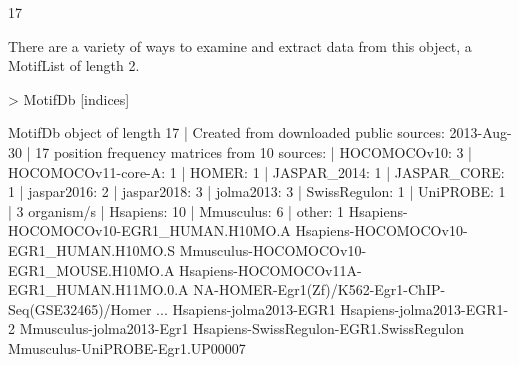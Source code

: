 \documentclass{article}
\renewenvironment{Schunk}{\vspace{\topsep}}{\vspace{\topsep}}
\begin{document}
\begin{Schunk}
\begin{Soutput}
[1] 17
\end{Soutput}
\end{Schunk}
There are a variety of ways to examine and extract data from this object, a MotifList of length 2.
\begin{Schunk}
\begin{Sinput}
> MotifDb [indices]
\end{Sinput}
\begin{Soutput}
MotifDb object of length 17
| Created from downloaded public sources: 2013-Aug-30
| 17 position frequency matrices from 10 sources:
|        HOCOMOCOv10:    3
| HOCOMOCOv11-core-A:    1
|              HOMER:    1
|        JASPAR_2014:    1
|        JASPAR_CORE:    1
|         jaspar2016:    2
|         jaspar2018:    3
|          jolma2013:    3
|       SwissRegulon:    1
|           UniPROBE:    1
| 3 organism/s
|           Hsapiens:   10
|          Mmusculus:    6
|              other:    1
Hsapiens-HOCOMOCOv10-EGR1_HUMAN.H10MO.A 
Hsapiens-HOCOMOCOv10-EGR1_HUMAN.H10MO.S 
Mmusculus-HOCOMOCOv10-EGR1_MOUSE.H10MO.A 
Hsapiens-HOCOMOCOv11A-EGR1_HUMAN.H11MO.0.A 
NA-HOMER-Egr1(Zf)/K562-Egr1-ChIP-Seq(GSE32465)/Homer 
...
Hsapiens-jolma2013-EGR1 
Hsapiens-jolma2013-EGR1-2 
Mmusculus-jolma2013-Egr1 
Hsapiens-SwissRegulon-EGR1.SwissRegulon 
Mmusculus-UniPROBE-Egr1.UP00007 
\end{Soutput}
\end{Schunk}
\end{document}
